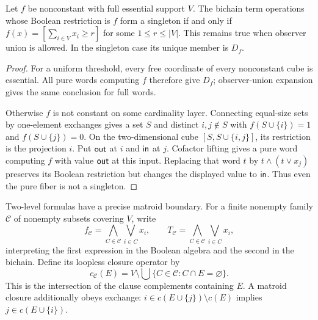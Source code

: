 \begin{corollary}
\label{core:cor:essential-unique-fiber}
Let $f$ be nonconstant with full essential support $V$. The bichain term operations
whose Boolean restriction is $f$ form a singleton if and only if
$f(x)=[\sum_{i\in V}x_i\geq r]$ for some $1\leq r\leq|V|$.
This remains true when observer union is allowed. In the singleton
case its unique member is $D_f$.
\end{corollary}
\begin{proof}
For a uniform threshold, every free coordinate of every nonconstant
cube is essential. All pure words computing $f$ therefore give $D_f$;
observer-union expansion gives the same conclusion for full words.

Otherwise $f$ is not constant on some cardinality layer. Connecting
equal-size sets by one-element exchanges gives a set $S$ and distinct
$i,j\notin S$ with $f(S\cup\{i\})=1$ and
$f(S\cup\{j\})=0$. On the two-dimensional cube
$[S,S\cup\{i,j\}]$, its restriction is the projection $i$.
Put $\mathsf{out}$ at $i$ and $\mathsf{in}$ at $j$. Cofactor lifting
gives a pure word computing $f$ with value $\mathsf{out}$ at this input.
Replacing that word $t$ by $t\wedge(t\vee x_j)$ preserves its
Boolean restriction but changes the displayed value to $\mathsf{in}$.
Thus even the pure fiber is not a singleton.
\end{proof}





Two-level formulas have a precise matroid boundary. For a finite
nonempty family $\mathcal C$ of nonempty subsets covering $V$, write
\[
 f_{\mathcal C}=\bigwedge_{C\in\mathcal C}\bigvee_{i\in C}x_i,
 \qquad
 T_{\mathcal C}=\bigwedge_{C\in\mathcal C}\bigvee_{i\in C}x_i,
\]
interpreting the first expression in the Boolean algebra and the second
in the bichain. Define its loopless closure operator by
\[
 c_{\mathcal C}(E)=
 V\setminus\bigcup\{C\in\mathcal C:C\cap E=\varnothing\}.
\]
This is the intersection of the clause complements containing $E$.
A matroid closure additionally obeys exchange:
$i\in c(E\cup\{j\})\setminus c(E)$ implies
$j\in c(E\cup\{i\})$.

